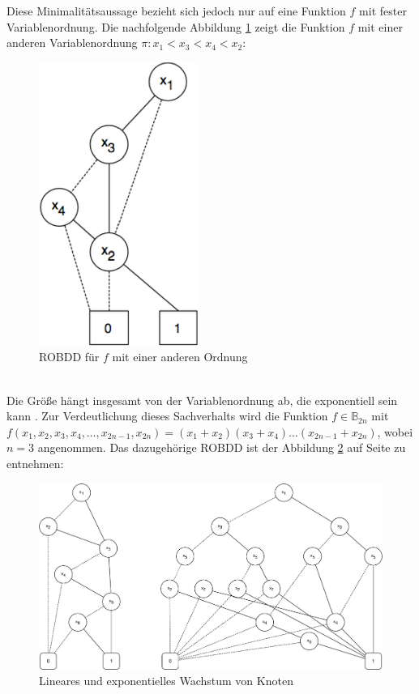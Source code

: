 \noindent
Diese Minimalitätsaussage bezieht sich jedoch nur auf eine Funktion $f$ mit fester Variablenordnung. Die nachfolgende Abbildung \ref{fig:robdd2} zeigt die Funktion $f$ mit einer anderen Variablenordnung $\pi : x_1 < x_3 < x_4 < x_2$:
\begin{figure}[bth]
	\centering
	\includegraphics[scale=0.9]{./img/robdd2}
	\caption[ROBDD für $f$ mit einer anderen Ordnung]{ROBDD für $f$ mit einer anderen Ordnung}
	\label{fig:robdd2}
\end{figure}\\
\noindent
Die Größe hängt insgesamt von der Variablenordnung ab, die exponentiell sein kann \cite{p2010}. Zur Verdeutlichung dieses Sachverhalts wird die Funktion $f \in \mathbb{B}_{2n}$ mit \\
$f(x_1, x_2, x_3, x_4, \dots, x_{2n-1}, x_{2n}) = (x_1+x_2) (x_3+x_4)\dots(x_{2n-1}+x_{2n})$, wobei $n=3$ angenommen. Das dazugehörige ROBDD ist der Abbildung \ref{fig:expSize} auf Seite \pageref{fig:expSize} zu entnehmen:
\newpage
\begin{figure}[bth]
	\centering
	\includegraphics[scale=0.3]{./img/expSize}
	\caption[Lineares und exponentielles Wachstum von Knoten]{Lineares und exponentielles Wachstum von Knoten}
	\label{fig:expSize}
\end{figure}
